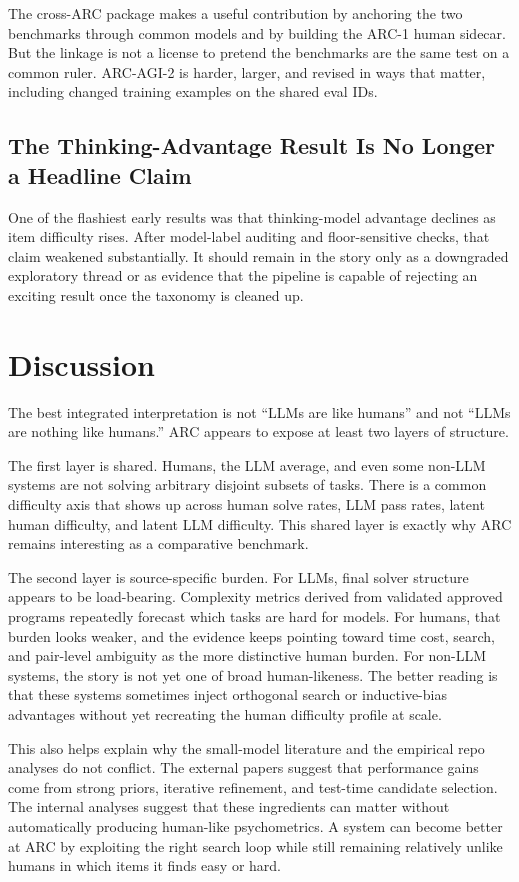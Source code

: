 \documentclass[11pt,letterpaper]{article}
\begin{document}
The cross-ARC package makes a useful contribution by anchoring the two benchmarks through common models and by building the ARC-1 human sidecar. But the linkage is not a license to pretend the benchmarks are the same test on a common ruler. ARC-AGI-2 is harder, larger, and revised in ways that matter, including changed training examples on the shared eval IDs.

\subsection{The Thinking-Advantage Result Is No Longer a Headline Claim}

One of the flashiest early results was that thinking-model advantage declines as item difficulty rises. After model-label auditing and floor-sensitive checks, that claim weakened substantially. It should remain in the story only as a downgraded exploratory thread or as evidence that the pipeline is capable of rejecting an exciting result once the taxonomy is cleaned up.

\section{Discussion}

The best integrated interpretation is not ``LLMs are like humans'' and not ``LLMs are nothing like humans.'' ARC appears to expose at least two layers of structure.

The first layer is shared. Humans, the LLM average, and even some non-LLM systems are not solving arbitrary disjoint subsets of tasks. There is a common difficulty axis that shows up across human solve rates, LLM pass rates, latent human difficulty, and latent LLM difficulty. This shared layer is exactly why ARC remains interesting as a comparative benchmark.

The second layer is source-specific burden. For LLMs, final solver structure appears to be load-bearing. Complexity metrics derived from validated approved programs repeatedly forecast which tasks are hard for models. For humans, that burden looks weaker, and the evidence keeps pointing toward time cost, search, and pair-level ambiguity as the more distinctive human burden. For non-LLM systems, the story is not yet one of broad human-likeness. The better reading is that these systems sometimes inject orthogonal search or inductive-bias advantages without yet recreating the human difficulty profile at scale.

This also helps explain why the small-model literature and the empirical repo analyses do not conflict. The external papers suggest that performance gains come from strong priors, iterative refinement, and test-time candidate selection. The internal analyses suggest that these ingredients can matter without automatically producing human-like psychometrics. A system can become better at ARC by exploiting the right search loop while still remaining relatively unlike humans in which items it finds easy or hard.
\end{document}
